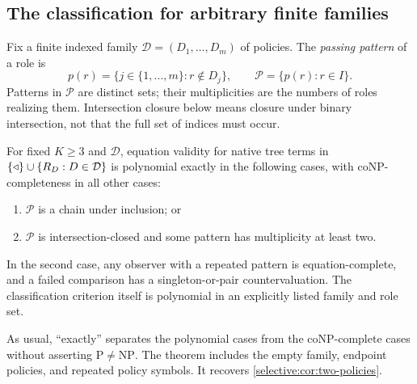 \subsection{The classification for arbitrary finite families}
\label{selective:sec:families}

Fix a finite indexed family $\mathcal D=(D_1,\ldots,D_m)$ of policies.
The \emph{passing pattern} of a role is
\[
 p(r)=\{j\in\{1,\ldots,m\}:r\notin D_j\},\qquad
 \mathcal P=\{p(r):r\in I\}.
\]
Patterns in $\mathcal P$ are distinct sets; their multiplicities are
the numbers of roles realizing them. Intersection closure below means
closure under binary intersection, not that the full set of indices
must occur.

\begin{theorem}\label{selective:thm:families}
For fixed $K\geq3$ and $\mathcal D$, equation validity for native tree
terms in $\{\mathbin{\triangleleft}\}\cup\{R_D:D\in\mathcal D\}$ is polynomial exactly
in the following cases, with coNP-completeness in all other cases:
\begin{enumerate}
\item $\mathcal P$ is a chain under inclusion; or
\item $\mathcal P$ is intersection-closed and some pattern has
      multiplicity at least two.
\end{enumerate}
In the second case, any observer with a repeated pattern is
equation-complete, and a failed comparison has a singleton-or-pair
countervaluation. The classification criterion itself is polynomial
in an explicitly listed family and role set.
\end{theorem}

As usual, ``exactly'' separates the polynomial cases from the
coNP-complete cases without asserting $\mathrm P\ne\mathrm{NP}$.
The theorem includes the empty family, endpoint policies, and repeated
policy symbols. It recovers \cref{selective:cor:two-policies}.

